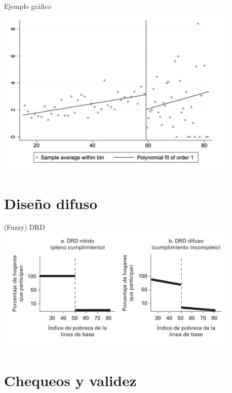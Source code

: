 \documentclass[
  ignorenonframetext,
]{beamer}
\begin{document}
\begin{frame}{Ejemplo gráfico}
\protect\hypertarget{ejemplo-gruxe1fico-3}{}
\includegraphics[width=0.9\textwidth,height=\textheight]{ej3}
\end{frame}

\hypertarget{diseuxf1o-difuso}{%
\section{Diseño difuso}\label{diseuxf1o-difuso}}

\begin{frame}{(Fuzzy) DRD}
\protect\hypertarget{fuzzy-drd}{}
\includegraphics[width=0.9\textwidth,height=\textheight]{fuzzy_ejemplo}
\end{frame}

\hypertarget{chequeos-y-validez}{%
\section{Chequeos y validez}\label{chequeos-y-validez}}
\end{document}
